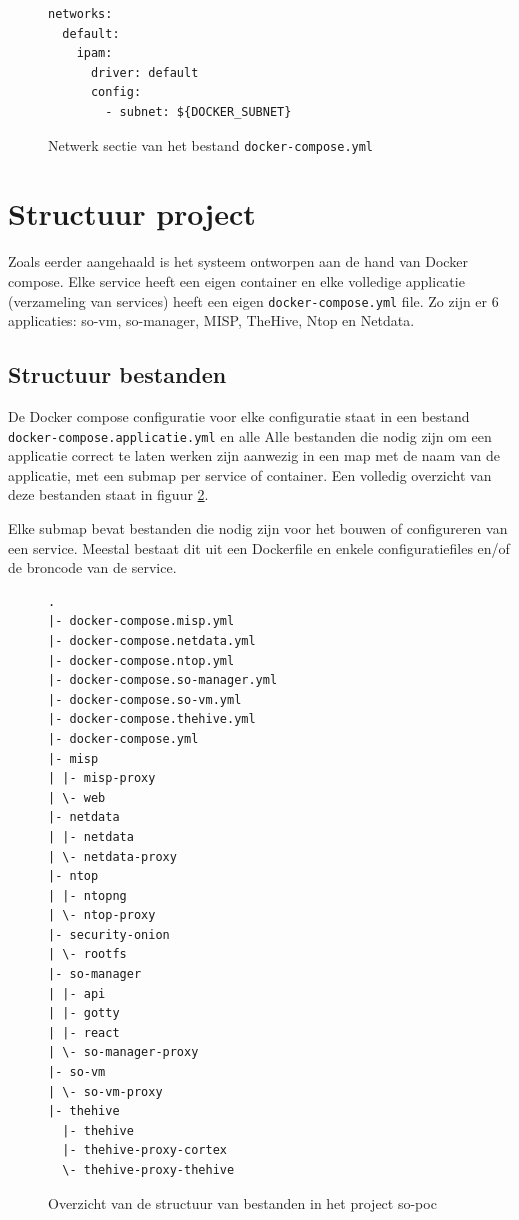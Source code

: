 \documentclass[a4paper,12pt]{report}
\begin{document}
\begin{figure}[H]
  \begin{lstlisting}
networks:
  default:
    ipam:
      driver: default
      config:
        - subnet: ${DOCKER_SUBNET}
  \end{lstlisting}
  \caption{Netwerk sectie van het bestand \lstinline|docker-compose.yml|}
  \label{fig:docker-compose-network}
\end{figure}

\section{Structuur project}
Zoals eerder aangehaald is het systeem ontworpen aan de hand van Docker compose.
Elke service heeft een eigen container en elke volledige applicatie (verzameling van services) heeft een eigen \lstinline|docker-compose.yml| file.
Zo zijn er 6 applicaties: so-vm, so-manager, MISP, TheHive, Ntop en Netdata.

\subsection{Structuur bestanden}
De Docker compose configuratie voor elke configuratie staat in een bestand \lstinline|docker-compose.applicatie.yml| en alle 
Alle bestanden die nodig zijn om een applicatie correct te laten werken zijn aanwezig in een map met de naam van de applicatie, met een submap per service of container.
Een volledig overzicht van deze bestanden staat in figuur \ref{fig:so-poc-structuur-docker-compose-containers}.

Elke submap bevat bestanden die nodig zijn voor het bouwen of configureren van een service.
Meestal bestaat dit uit een Dockerfile en enkele configuratiefiles en/of de broncode van de service.

\begin{figure}[H]
  \begin{lstlisting}
.
|- docker-compose.misp.yml
|- docker-compose.netdata.yml
|- docker-compose.ntop.yml
|- docker-compose.so-manager.yml
|- docker-compose.so-vm.yml
|- docker-compose.thehive.yml
|- docker-compose.yml
|- misp
| |- misp-proxy
| \- web
|- netdata
| |- netdata
| \- netdata-proxy
|- ntop
| |- ntopng
| \- ntop-proxy
|- security-onion
| \- rootfs
|- so-manager
| |- api
| |- gotty
| |- react
| \- so-manager-proxy
|- so-vm
| \- so-vm-proxy
|- thehive
  |- thehive
  |- thehive-proxy-cortex
  \- thehive-proxy-thehive
  \end{lstlisting}
  \caption{Overzicht van de structuur van bestanden in het project so-poc}
  \label{fig:so-poc-structuur-docker-compose-containers}
\end{figure}
\end{document}
